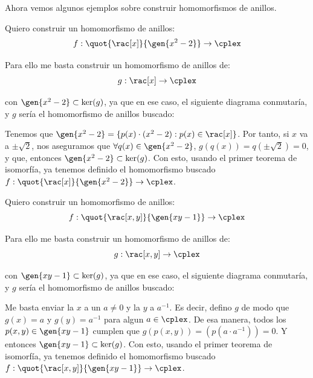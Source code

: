 Ahora vemos algunos ejemplos sobre construir homomorfismos de anillos.
\begin{example}
Quiero construir un homomorfismo de anillos:
$$f: \quot{\rac[x]}{\gen{x^2-2}} \rightarrow \cplex$$

Para ello me basta construir un homomorfismo de anillos de:
$$g: \rac[x] \rightarrow \cplex$$

con $\gen{x^2-2} \subset \ker (g)$, ya que en ese caso, el siguiente diagrama conmutaría, y $g$ sería el homomorfismo de anillos buscado:


Tenemos que $\gen{x^2-2}=\{ p(x)\cdot(x^2-2):p(x) \in \rac[x] \}$. Por tanto, si $x$ va a $\pm \sqrt{2}$, nos aseguramos que $\forall q(x) \in \gen{x^2-2}$, $g(q(x))=q(\pm \sqrt{2})=0$, y que, entonces $ \gen{x^2-2} \subset \ker (g)$. Con esto, usando el primer teorema de isomorfía, ya tenemos definido el homomorfismo buscado $f: \quot{\rac[x]}{\gen{x^2-2}} \rightarrow \cplex$.
\end{example}

\begin{example}
Quiero construir un homomorfismo de anillos:
$$f: \quot{\rac[x,y]}{\gen{xy-1}} \rightarrow \cplex$$

Para ello me basta construir un homomorfismo de anillos de:
$$g: \rac[x,y] \rightarrow \cplex$$

con $\gen{xy-1} \subset \ker (g)$, ya que en ese caso, el siguiente diagrama conmutaría, y $g$ sería el homomorfismo de anillos buscado:


Me basta enviar la $x$ a un $a\neq 0$ y la $y$ a $a^{-1}$. Es decir, defino $g$ de modo que $g(x)=a$ y $g(y)=a^{-1}$ para algun $a \in \cplex$. De esa manera, todos los $p(x,y) \in \gen{xy-1}$ cumplen que $g(p(x,y))=(p(a\cdot a^{-1}))=0$. Y entonces $ \gen{xy-1} \subset \ker (g)$. Con esto, usando el primer teorema de isomorfía, ya tenemos definido el homomorfismo buscado $f: \quot{\rac[x,y]}{\gen{xy-1}} \rightarrow \cplex$.
\end{example}



